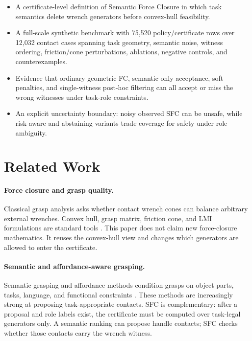 \documentclass{article}
\begin{document}
\begin{itemize}
\item A certificate-level definition of Semantic Force Closure in which task semantics delete wrench generators before convex-hull feasibility.
\item A full-scale synthetic benchmark with 75,520 policy/certificate rows over 12,032 contact cases spanning task geometry, semantic noise, witness ordering, friction/cone perturbations, ablations, negative controls, and counterexamples.
\item Evidence that ordinary geometric FC, semantic-only acceptance, soft penalties, and single-witness post-hoc filtering can all accept or miss the wrong witnesses under task-role constraints.
\item An explicit uncertainty boundary: noisy observed SFC can be unsafe, while risk-aware and abstaining variants trade coverage for safety under role ambiguity.
\end{itemize}

\section{Related Work}

\paragraph{Force closure and grasp quality.}
Classical grasp analysis asks whether contact wrench cones can balance arbitrary external wrenches. Convex hull, grasp matrix, friction cone, and LMI formulations are standard tools \citep{lit007,lit009,lit015}. This paper does not claim new force-closure mathematics. It reuses the convex-hull view and changes which generators are allowed to enter the certificate.

\paragraph{Semantic and affordance-aware grasping.}
Semantic grasping and affordance methods condition grasps on object parts, tasks, language, and functional constraints \citep{lit003,lit004,lit008,lit011,lit012,lit043,lit055}. These methods are increasingly strong at proposing task-appropriate contacts. SFC is complementary: after a proposal and role labels exist, the certificate must be computed over task-legal generators only. A semantic ranking can propose handle contacts; SFC checks whether those contacts carry the wrench witness.
\end{document}
